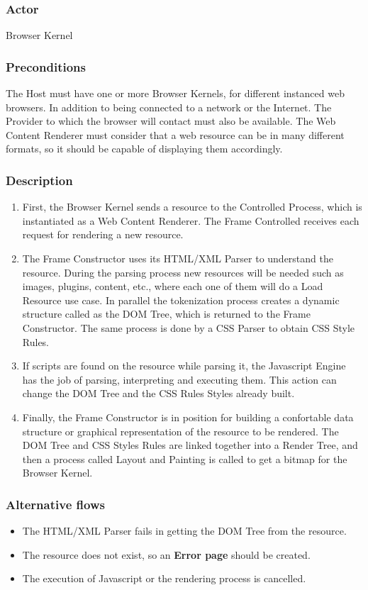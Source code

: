 \documentclass[prodmode,acmtecs]{acmsmall}
\begin{document}
\begin{shaded}
    \subsubsection*{Actor} Browser Kernel
    \subsubsection*{Preconditions} The Host must have one or more Browser Kernels, for different instanced web browsers. In addition to being connected to a network or the Internet. The Provider to which the browser will contact must also be available. The Web Content Renderer must consider that a web resource can be in many different formats, so it should be capable of displaying them accordingly.

    \subsubsection*{Description}
      \begin{enumerate}\leftskip2.5em
        \item First, the Browser Kernel sends a resource to the Controlled Process, which is instantiated as a Web Content Renderer. The Frame Controlled receives each request for rendering a new resource.
        \item The Frame Constructor uses its HTML/XML Parser to understand the resource. During the parsing process new resources will be needed such as images, plugins, content, etc., where each one of them will do a Load Resource use case. In parallel the tokenization process creates a dynamic structure called as the DOM Tree, which is returned to the Frame Constructor. The same process is done by a CSS Parser to obtain CSS Style Rules.
        \item If scripts are found on the resource while parsing it, the Javascript Engine has the job of parsing, interpreting and executing them. This action can change the DOM Tree and the CSS Rules Styles already built.
        \item Finally, the Frame Constructor is in position for building a confortable data structure or graphical representation of the resource to be rendered. The DOM Tree and CSS Styles Rules are linked together into a Render Tree, and then a process called Layout and Painting is called to get a bitmap \cite{gpuchrome,gecko2} for the Browser Kernel.
      \end{enumerate}

    \subsubsection*{Alternative flows} 
    \begin{itemize}\leftskip2.2em
    \item The HTML/XML Parser fails in getting the DOM Tree from the resource.
    \item The resource does not exist, so an \textbf{Error page} should be created. 
    \item The execution of Javascript or the rendering process is cancelled.
      \end{itemize}

\end{shaded}
\end{document}
